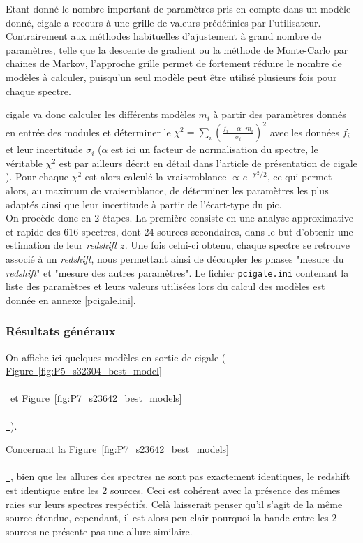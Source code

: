 \documentclass[12pt, a4paper]{article}
\newcommand*{\figref}[2][]{%
  \hyperref[{#2}]{%
    Figure~\ref*{#2}%
    \ifx\\#1\\%
    \else
      \,#1%
    \fi
  }%
}
\begin{document}
Etant donné le nombre important de paramètres pris en compte dans un modèle donné, \gls{cigale} a recours à une grille de valeurs prédéfinies par l'utilisateur. Contrairement aux méthodes habituelles d'ajustement à grand nombre de paramètres, telle que la descente de gradient ou la méthode de Monte-Carlo par chaines de Markov, l'approche grille permet de fortement réduire le nombre de modèles à calculer, puisqu'un seul modèle peut être utilisé plusieurs fois pour chaque spectre.

\gls{cigale} va donc calculer les différents modèles $m_i$ à partir des paramètres donnés en entrée des modules et déterminer le $\chi^2 = \sum_{i} (\frac{f_i - \alpha \cdot m_i}{\sigma_i})^2$ avec les données $f_i$ et leur incertitude $\sigma_i$ ($\alpha$ est ici un facteur de normalisation du spectre, le véritable $\chi^2$ est par ailleurs décrit en détail dans l'article de présentation de \gls{cigale} \parencite{cigale}). Pour chaque $\chi^2$ est alors calculé la vraisemblance $\propto e^{-\chi^2 / 2}$, ce qui permet alors, au maximum de vraisemblance, de déterminer les paramètres les plus adaptés ainsi que leur incertitude à partir de l'écart-type du pic.\\

On procède donc en 2 étapes. La première consiste en une analyse approximative et rapide des 616 spectres, dont 24 sources secondaires, dans le but d'obtenir une estimation de leur \textit{redshift} $z$. Une fois celui-ci obtenu, chaque spectre se retrouve associé à un \textit{redshift}, nous permettant ainsi de découpler les phases "mesure du \textit{redshift}" et "mesure des autres paramètres". Le fichier \texttt{pcigale.ini} contenant la liste des paramètres et leurs valeurs utilisées lors du calcul des modèles est donnée en annexe \ref{pcigale.ini}.

\subsubsection{Résultats généraux}

On affiche ici quelques modèles en sortie de \gls{cigale} (\figref{fig:P5_s32304_best_model} et \figref{fig:P7_s23642_best_models}).

Concernant la \figref{fig:P7_s23642_best_models}, bien que les allures des spectres ne sont pas exactement identiques, le redshift est identique entre les 2 sources. Ceci est cohérent avec la présence des mêmes raies sur leurs spectres respéctifs. Celà laisserait penser qu'il s'agit de la même source étendue, cependant, il est alors peu clair pourquoi la bande entre les 2 sources ne présente pas une allure similaire.
\end{document}
